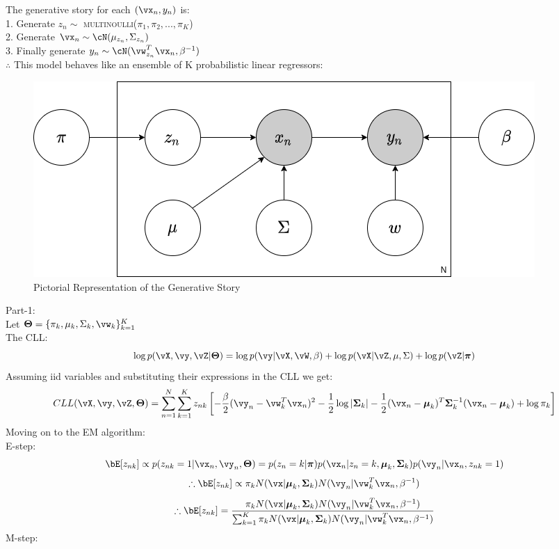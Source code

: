 \documentclass[a4paper,12pt]{article}
\begin{document}
\begin{mlsolution}
The generative story for each $(\vx_n,y_n)$ is:\\
1. Generate $z_n\sim$ \textsc{multinoulli}($\pi_1,\pi_2,...,\pi_K$)\\
2. Generate $\vx_n \sim \cN(\mu_{z_n},\Sigma_{z_n})$\\
3. Finally generate $y_n\sim\cN(\vw^T_{z_n}\vx_n,\beta^{-1})$\\

$\therefore$ This model behaves like an ensemble of K probabilistic linear regressors:\\
\begin{figure}[H]
    \centering
    \begin{minipage}{\textwidth}
        \centering
        \includegraphics[width=\textwidth]{figure.png} %
        \caption{Pictorial Representation of the Generative Story}
    \end{minipage}\hfill
\end{figure}
Part-1: \\

Let $\boldsymbol\Theta = \{\pi_k,\mu_k,\Sigma_k,\vw_k\}_{k=1}^K$\\

The CLL:
\[
\log p (\vX, \vy, \vZ | \boldsymbol\Theta) = \log p (\vy | \vX,\vW, \beta) + \log p (\vX | \vZ, \mu, \Sigma) + \log p (\vZ | \boldsymbol\pi)
\]
Assuming iid variables and substituting their expressions in the CLL we get:
\[
CLL(\vX,\vy,\vZ,\boldsymbol\Theta)=\sum_{n=1}^N\sum_{k=1}^Kz_{nk}\left[-\frac{\beta}{2}(\vy_n-\vw_k^T\vx_n)^2-\frac{1}{2}\log|\boldsymbol\Sigma_k|-\frac{1}{2}(\vx_n-\boldsymbol\mu_k)^T\boldsymbol\Sigma_k^{-1}(\vx_n-\boldsymbol\mu_k)+\log\pi_k\right]
\]
Moving on to the EM algorithm:\\

E-step: \\
\[
\bE[z_{nk}]\propto p(z_{nk}=1|\vx_n,\vy_n,\boldsymbol\Theta)={p(z_n=k|\boldsymbol\pi)p(\vx_n|z_n=k,\boldsymbol\mu_k,\boldsymbol\Sigma_k)}p(\vy_n|\vx_n,z_{nk}=1)
\]
\[
\therefore\bE[z_{nk}]\propto \pi_k N(\vx|\boldsymbol\mu_k,\boldsymbol\Sigma_k) N(\vy_n|\vw_k^T\vx_n,\beta^{-1})
\]
\[
\therefore\bE[z_{nk}]= \frac{\pi_k N(\vx|\boldsymbol\mu_k,\boldsymbol\Sigma_k) N(\vy_n|\vw_k^T\vx_n,\beta^{-1})}{\sum_{k=1}^K\pi_k N(\vx|\boldsymbol\mu_k,\boldsymbol\Sigma_k) N(\vy_n|\vw_k^T\vx_n,\beta^{-1})}
\]
M-step:\\


\end{mlsolution}
\end{document}
